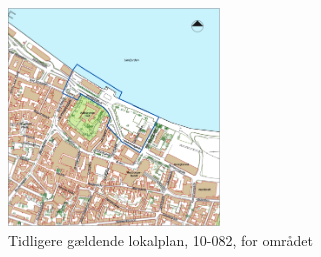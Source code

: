 \begin{figure}[htbp]
	\centering
	\includegraphics[width=0.5\textwidth]{billeder/lokalplanoversigt.png}
	\caption{Tidligere gældende lokalplan, 10-082, for området \citep[ s. 17]{gammellokalplan}}
	\label{fig:10-082}
\end{figure}

